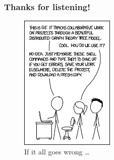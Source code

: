 \documentclass{beamer}
\begin{document}
\begin{frame}
\frametitle{Thanks for listening!}
\begin{figure}[H]
	\centering
	\includegraphics[width=0.4\textwidth]{xkcdgit.png}
	\caption{If it all goes wrong \ldots \footnotemark }
	\label{fig:xkcdversion}
\end{figure}
\end{frame}
\end{document}
